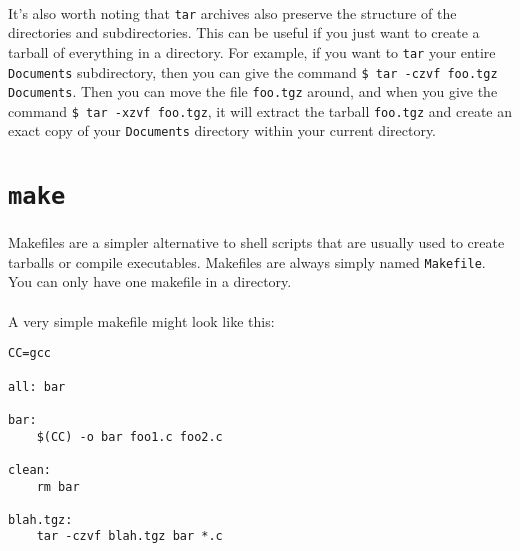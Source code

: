 \documentclass{article}
\begin{document}
\paragraph{} It's also worth noting that \texttt{tar} archives also preserve the structure of the directories and subdirectories. This can be useful if you just want to create a tarball of everything in a directory. For example, if you want to \texttt{tar} your entire \texttt{Documents} subdirectory, then you can give the command \texttt{\$ tar -czvf foo.tgz Documents}. Then you can move the file \texttt{foo.tgz} around, and when you give the command \texttt{\$ tar -xzvf foo.tgz}, it will extract the tarball \texttt{foo.tgz} and create an exact copy of your \texttt{Documents} directory within your current directory.

\section{\texttt{make}}

\paragraph{} Makefiles are a simpler alternative to shell scripts that are usually used to create tarballs or compile executables. Makefiles are always simply named \texttt{Makefile}. You can only have one makefile in a directory.

\paragraph{} A very simple makefile might look like this:

\begin{verbatim}
CC=gcc

all: bar

bar:
    $(CC) -o bar foo1.c foo2.c

clean:
    rm bar

blah.tgz:
    tar -czvf blah.tgz bar *.c

\end{verbatim}
\end{document}
